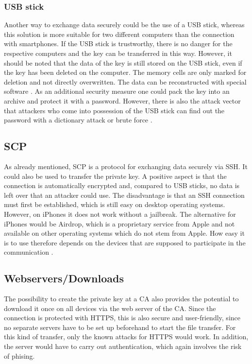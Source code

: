 \documentclass[12pt,oneside,a4paper,parskip]{scrbook}
\begin{document}
\subsubsection{USB stick}
Another way to exchange data securely could be the use of a USB stick, whereas this solution is more suitable for two different computers than the connection with smartphones. If the USB stick is trustworthy, there is no danger for the respective computers and the key can be transferred in this way. However, it should be noted that the data of the key is still stored on the USB stick, even if the key has been deleted on the computer. The memory cells are only marked for deletion and not directly overwritten. The data can be reconstructed with special software \parencite{bsi_bsi_loeschen}. \newline
As an additional security measure one could pack the key into an archive and protect it with a password. However, there is also the attack vector that attackers who come into possession of the USB stick can find out the password with a dictionary attack or brute force \parencite{rehim_effective_2016}.

\subsection{SCP}
As already mentioned, SCP is a protocol for exchanging data securely via SSH. It could also be used to transfer the private key. A positive aspect is that the connection is automatically encrypted and, compared to USB sticks, no data is left over that an attacker could use. The disadvantage is that an SSH connection must first be established, which is still easy on desktop operating systems. However, on iPhones it does not work without a jailbreak. The alternative for iPhones would be Airdrop, which is a proprietary service from Apple and not available on other operating systems which do not stem from Apple. How easy it is to use therefore depends on the devices that are supposed to participate in the communication \parencite{winscp_how_nodate}.

\subsection{Webservers/Downloads}
The possibility to create the private key at a CA also provides the potential to download it once on all devices via the web server of the CA. Since the connection is protected with HTTPS, this is also secure and user-friendly, since no separate servers have to be set up beforehand to start the file transfer. For this kind of transfer, only the known attacks for HTTPS would work. In addition, the server would have to carry out authentication, which again involves the risk of phising.
\end{document}
